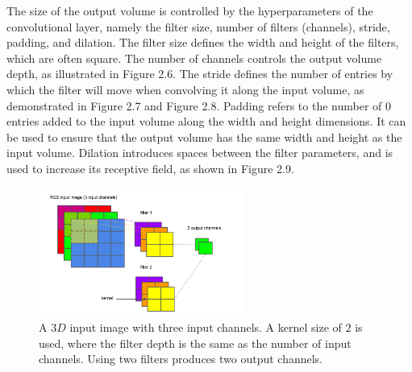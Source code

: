\noindent  The size of the output volume is controlled by the hyperparameters of the convolutional layer, namely the filter size, number of filters (channels), stride, padding, and dilation. The filter size defines the width and height of the filters, which are often square. The number of channels controls the output volume depth, as illustrated in Figure 2.6. The stride defines the number of entries by which the filter will move when convolving it along the input volume, as demonstrated in Figure 2.7 and Figure 2.8. Padding refers to the number of $ 0 $ entries added to the input volume along the width and height dimensions. It can be used to ensure that the output volume has the same width and height as the input volume. Dilation introduces spaces between the filter parameters, and is used to increase its receptive field, as shown in Figure 2.9. \par

\begin{figure}[H]
   	\centering
    	\includegraphics[width=0.6\textwidth, height=0.3\textwidth]{channels}
	\captionsetup{justification=centering}
	\caption{A $ 3D $ input image with three input channels. A kernel size of $ 2 $ is used, where the filter depth is the same as the number of input channels. Using two filters produces two output channels.}
\end{figure}

